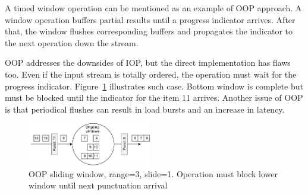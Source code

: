 A timed window operation can be mentioned as an example of OOP approach. A window operation buffers partial results until a progress indicator arrives. After that, the window flushes corresponding buffers and propagates the indicator to the next operation down the stream.

OOP addresses the downsides of IOP, but the direct implementation has flaws too. Even if the input stream is totally ordered, the operation must wait for the progress indicator. Figure~\ref{oop} illustrates such case. Bottom window is complete but must be blocked until the indicator for the item 11 arrives. Another issue of OOP is that periodical flushes can result in load bursts and an increase in latency. 

\begin{figure}[htbp]
  \centering
  \includegraphics[width=0.48\textwidth]{pics/oop}
  \caption{OOP sliding window, range=3, slide=1. Operation must block lower window until next punctuation arrival }
  \label {oop}
\end{figure}
